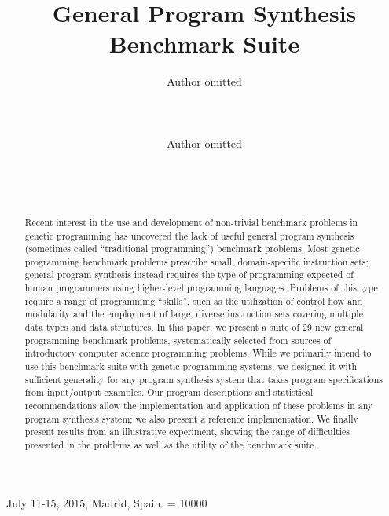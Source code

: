 \documentclass{sig-alternate}
\begin{document}
%
 {July 11-15, 2015, Madrid, Spain.}
\widowpenalty = 10000

\title{General Program Synthesis Benchmark Suite}


\author{
\alignauthor
Author omitted\\
       \\
       \\
       \\
\alignauthor
Author omitted\\
       \\
       \\
       \\
}

\maketitle

\begin{abstract}
Recent interest in the use and development of non-trivial benchmark problems in genetic programming has uncovered the lack of useful general program synthesis (sometimes called ``traditional programming'') benchmark problems. Most genetic programming benchmark problems prescribe small, domain-specific instruction sets; general program synthesis instead requires the type of programming expected of human programmers using higher-level programming languages. Problems of this type require a range of programming ``skills'', such as the utilization of control flow and modularity and the employment of large, diverse instruction sets covering multiple data types and data structures. In this paper, we present a suite of 29 new general programming benchmark problems, systematically selected from sources of introductory computer science programming problems. While we primarily intend to use this benchmark suite with genetic programming systems, we designed it with sufficient generality for any program synthesis system that takes program specifications from input/output examples. Our program descriptions and statistical recommendations allow the implementation and application of these problems in any program synthesis system; we also present a reference implementation. We finally present results from an illustrative experiment, showing the range of difficulties presented in the problems as well as the utility of the benchmark suite.
\end{abstract}
\end{document}
